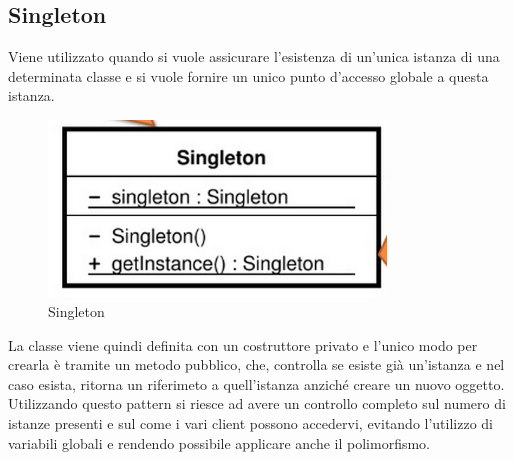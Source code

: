 \subsection{Singleton}
Viene utilizzato quando si vuole assicurare l'esistenza di un'unica istanza di una determinata classe e si vuole fornire un unico punto d'accesso globale a questa istanza.
\begin{figure}[ht]
    \centering
    \includegraphics[width=0.8\textwidth]{immagini/singleton.png}
    \caption{Singleton}
\end{figure}
\FloatBarrier
La classe viene quindi definita con un costruttore privato e l'unico modo per crearla è tramite un metodo pubblico, che, controlla se esiste già un'istanza e nel caso esista, ritorna un riferimeto a quell'istanza anziché creare un nuovo oggetto.
Utilizzando questo pattern si riesce ad avere un controllo completo sul numero di istanze presenti e sul come i vari client possono accedervi, evitando l'utilizzo di variabili globali e rendendo possibile applicare anche il polimorfismo.